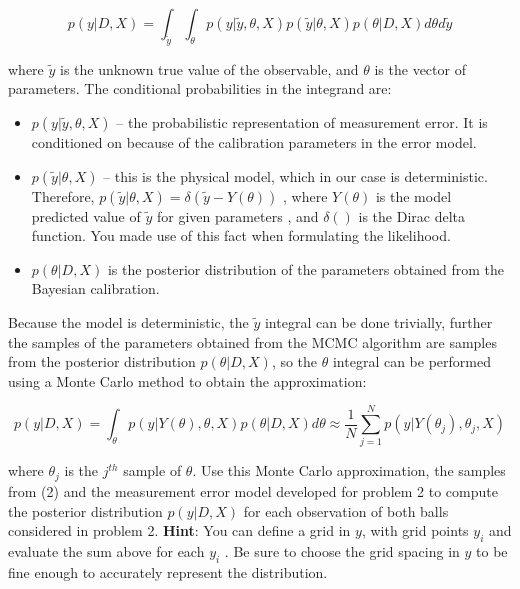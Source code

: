 \documentclass{article}
\begin{document}
\begin{equation}
p\left(y|D,X\right)=\int_{\tilde{y}}\int_{\theta}p\left(y|\tilde{y},\theta,X\right)p\left(\tilde{y}|\theta,X\right)p\left(\theta|D,X\right)d\theta d\tilde{y}
\end{equation}


where $\tilde{y}$ is the unknown true value of the observable, and
$\theta$ is the vector of parameters. The conditional probabilities
in the integrand are:
\begin{itemize}
\item $p\left(y|\tilde{y},\theta,X\right)$ -- the probabilistic representation
of measurement error. It is conditioned on because of the calibration
parameters in the error model.
\item $p\left(\tilde{y}|\theta,X\right)$ -- this is the physical model,
which in our case is deterministic. Therefore, $p\left(\tilde{y}|\theta,X\right)=\delta\left(\tilde{y}-Y\left(\theta\right)\right)$
, where $Y\left(\theta\right)$ is the model predicted value of $\tilde{y}$
for given parameters , and $\delta\left(\right)$ is the Dirac delta
function. You made use of this fact when formulating the likelihood.
\item $p\left(\theta|D,X\right)$ is the posterior distribution of the parameters
obtained from the Bayesian calibration.
\end{itemize}
Because the model is deterministic, the $\tilde{y}$ integral can
be done trivially, further the samples of the parameters obtained
from the MCMC algorithm are samples from the posterior distribution
$p\left(\theta|D,X\right)$, so the $\theta$ integral can be performed
using a Monte Carlo method to obtain the approximation:

\begin{equation}
p\left(y|D,X\right)=\int_{\theta}p\left(y|Y\left(\theta\right),\theta,X\right)p\left(\theta|D,X\right)d\theta\approx\frac{1}{N}\sum_{j=1}^{N}p\left(y|Y\left(\theta_{j}\right),\theta_{j},X\right)
\end{equation}


where $\theta_{j}$ is the $j^{th}$ sample of $\theta$. Use this
Monte Carlo approximation, the samples from (2) and the measurement
error model developed for problem 2 to compute the posterior distribution
$p\left(y|D,X\right)$ for each observation of both balls considered
in problem 2. \textbf{Hint}: You can define a grid in $y$, with grid
points $y_{i}$ and evaluate the sum above for each $y_{i}$ . Be
sure to choose the grid spacing in $y$ to be fine enough to accurately
represent the distribution.
\end{document}
